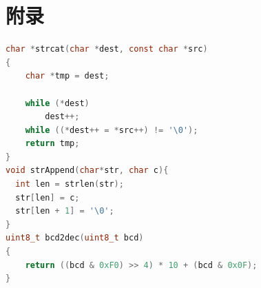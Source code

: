 \documentclass[a4paper, 11pt]{article} %
\begin{document}
\section{附录}

\begin{lstlisting}[language={c},label=utilsForDisp,caption=加工和显示日期时间]
char *strcat(char *dest, const char *src)
{
    char *tmp = dest;

    while (*dest)
        dest++;
    while ((*dest++ = *src++) != '\0');
    return tmp;
}
void strAppend(char*str, char c){
  int len = strlen(str);
  str[len] = c;
  str[len + 1] = '\0';
}
uint8_t bcd2dec(uint8_t bcd)
{
    return ((bcd & 0xF0) >> 4) * 10 + (bcd & 0x0F);
}
\end{lstlisting}

\end{document}
